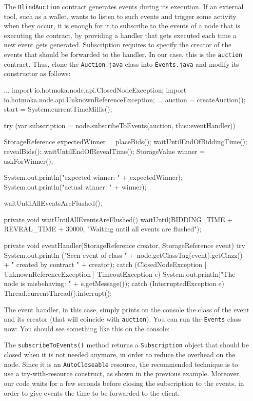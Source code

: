 The \texttt{BlindAuction} contract generates events during its execution. If an external tool, such
as a wallet, wants to listen to such events and trigger some activity when they occur,
it is enough for it to subscribe to the events of a node that is executing the contract,
by providing a handler that gets executed each time a new event gets generated.
Subscription requires to specify the creator of the events that should be forwarded to the
handler. In our case, this is the \texttt{auction} contract. Thus, clone the \texttt{Auction.java} class into
\texttt{Events.java} and modify its constructor as follows:
%
\begin{codebox}\begin{javalst}
...
import io.hotmoka.node.api.ClosedNodeException;
import io.hotmoka.node.api.UnknownReferenceException;
...
auction = createAuction();
start = System.currentTimeMillis();

try (var subscription = node.subscribeToEvents(auction, this::eventHandler)) {
  StorageReference expectedWinner = placeBids();
  waitUntilEndOfBiddingTime();
  revealBids();
  waitUntilEndOfRevealTime();
  StorageValue winner = askForWinner();

  System.out.println("expected winner: " + expectedWinner);
  System.out.println("actual winner: " + winner);

  waitUntilAllEventsAreFlushed();
}

private void waitUntilAllEventsAreFlushed() {
  waitUntil(BIDDING_TIME + REVEAL_TIME + 30000, "Waiting until all events are flushed");
}

private void eventHandler(StorageReference creator, StorageReference event) {
  try {
    System.out.println
      ("Seen event of class " + node.getClassTag(event).getClazz()
       + " created by contract " + creator);
  }
  catch (ClosedNodeException | UnknownReferenceException | TimeoutException e) {
    System.out.println("The node is misbehaving: " + e.getMessage());
  }
  catch (InterruptedException e) {
    Thread.currentThread().interrupt();
  }
}
\end{javalst}\end{codebox}
%
The event handler, in this case, simply prints on the console the class of the event and its creator
(that will coincide with \texttt{auction}). You can run the \texttt{Events} class now:
%
%
You should see something like this on the console:
%
%
\begin{commentbox}
The \texttt{subscribeToEvents()}
method returns a \texttt{Subscription} object that should be
closed when it is not needed anymore, in order to reduce the overhead on the node.
Since it is an \texttt{AutoCloseable} resource, the recommended technique is to use a
try-with-resource construct, as shown in the previous example.
Moreover, our code waits for a few seconds before closing the
subscription to the events, in order to give events the time to be forwarded to the client.
\end{commentbox}

